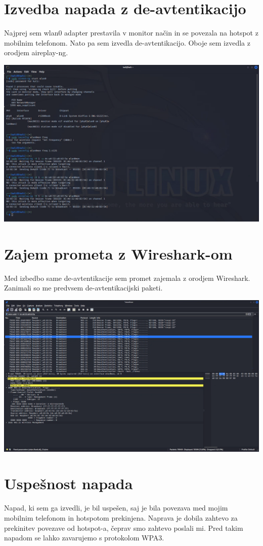 \documentclass[11pt,a4paper,slovene]{article}
\begin{document}
\section{Izvedba napada z de-avtentikacijo}
Najprej sem wlan0 adapter prestavila v monitor način in se povezala na hotspot z mobilnim telefonom. Nato pa sem izvedla de-avtentikacijo. Oboje sem izvedla z orodjem aireplay-ng.

\includegraphics[width=\textwidth]{commands}

\section{Zajem prometa z Wireshark-om}
Med izbedbo same de-avtentikacije sem promet zajemala z orodjem Wireshark. Zanimali so me predvsem de-avtentikacijski paketi.

\includegraphics[width=\textwidth]{zajem_paketkov}

\section{Uspešnost napada}
Napad, ki sem ga izvedli, je bil uspešen, saj je bila povezava med mojim mobilnim telefonom in hotspotom prekinjena. Naprava je dobila zahtevo za prekinitev povezave od hotspot-a, čeprav smo zahtevo poslali mi. Pred takim napadom se lahko zavarujemo s protokolom WPA3.


\pagebreak
\nocite{*}
\end{document}
